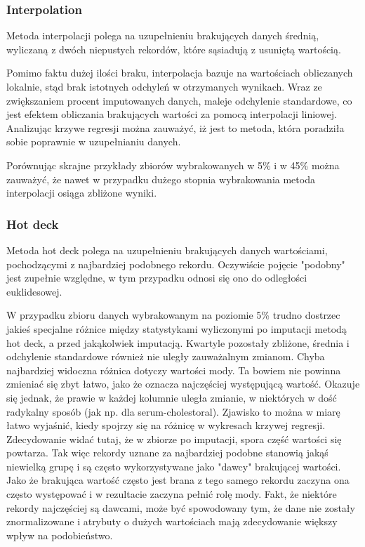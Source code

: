 \documentclass{classrep}
\begin{document}
{        \subsubsection{Interpolation}
        \label{summary:interpolation} {
            Metoda interpolacji polega na uzupełnieniu brakujących danych średnią, wyliczaną z dwóch niepustych rekordów, które sąsiadują z usuniętą wartością.

            Pomimo faktu dużej ilości braku, interpolacja bazuje na wartościach obliczanych lokalnie, stąd brak istotnych odchyleń w otrzymanych wynikach. Wraz ze zwiększaniem procent imputowanych danych, maleje odchylenie standardowe, co jest efektem obliczania brakujących wartości za pomocą interpolacji liniowej. Analizując krzywe regresji można zauważyć, iż jest to metoda, która poradziła sobie poprawnie w uzupełnianiu danych.

            Porównując skrajne przykłady zbiorów wybrakowanych w 5\% i w 45\% można zauważyć, że nawet w przypadku dużego stopnia wybrakowania metoda interpolacji osiąga zbliżone wyniki.
        }

        \subsubsection{Hot deck}
        \label{summary:dot-deck} {
            Metoda hot deck polega na uzupełnieniu brakujących danych wartościami, pochodzącymi z najbardziej
            podobnego rekordu. Oczywiście pojęcie "podobny" jest zupełnie względne, w tym przypadku odnosi się ono
            do odległości euklidesowej.

            W przypadku zbioru danych wybrakowanym na poziomie 5\% trudno dostrzec jakieś specjalne różnice między statystykami wyliczonymi po imputacji metodą hot deck, a przed jakąkolwiek imputacją. Kwartyle pozostały zbliżone, średnia i odchylenie standardowe również nie uległy zauważalnym zmianom. Chyba najbardziej widoczna różnica dotyczy wartości mody. Ta bowiem nie powinna zmieniać się zbyt łatwo, jako że oznacza najczęściej występującą wartość. Okazuje się jednak, że prawie w każdej kolumnie uległa zmianie, w niektórych w dość radykalny sposób (jak np. dla serum-cholestoral). Zjawisko to można w miarę łatwo wyjaśnić, kiedy spojrzy się na różnicę w wykresach krzywej regresji. Zdecydowanie widać tutaj, że w zbiorze po imputacji, spora część wartości się powtarza. Tak więc rekordy uznane za najbardziej podobne stanowią jakąś niewielką grupę i są często wykorzystywane jako "dawcy" brakującej wartości. Jako że brakująca wartość często jest brana z tego samego rekordu zaczyna ona często występować i w rezultacie zaczyna pełnić rolę mody. Fakt, że niektóre rekordy najczęściej są dawcami, może być spowodowany tym, że dane nie zostały znormalizowane i atrybuty o dużych wartościach mają zdecydowanie większy wpływ na podobieństwo.

}}
\end{document}

